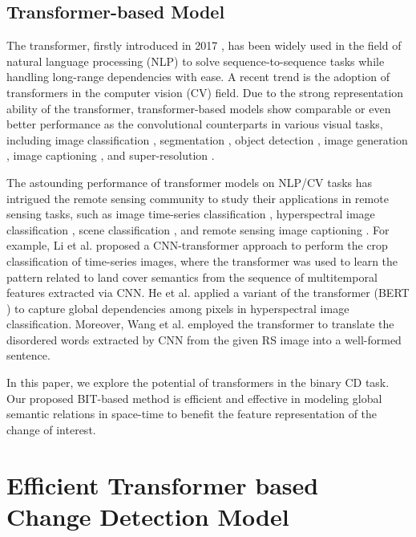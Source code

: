 \documentclass[journal]{IEEEtran}
\begin{document}
\subsection{Transformer-based Model}

The transformer, firstly introduced in 2017 \cite{Vaswani2017}, has been widely used in the field of natural language processing (NLP) to solve sequence-to-sequence tasks while handling long-range dependencies with ease. A recent trend is the adoption of transformers in the computer vision (CV) field. Due to the strong representation ability of the transformer, transformer-based models show comparable or even better performance as the convolutional counterparts in various visual tasks, including image classification \cite{Dosovitskiy2020, Touvron2020, Wu2020}, segmentation \cite{Zhang2020c, Wu2020, Zheng2020}, object detection \cite{Zhang2020c, Carion2020, Zhu2021}, image generation \cite{Chen2020h, Esser2020}, image captioning \cite{Liu2021}, and super-resolution \cite{Yang2020c, Chen2020g}.

The astounding performance of transformer models on NLP/CV tasks has intrigued the remote sensing community to study their applications in remote sensing tasks, such as image time-series classification \cite{Yuan2020, Li2020c}, hyperspectral image classification \cite{He2020a}, scene classification \cite{Bazi2021}, and remote sensing image captioning \cite{Shen2020a, Wang2020e}. For example, Li et al. \cite{Li2020c} proposed a CNN-transformer approach to perform the crop classification of time-series images, where the transformer was used to learn the pattern related to land cover semantics from the sequence of multitemporal features extracted via CNN. He et al. \cite{He2020a} applied a variant of the transformer (BERT \cite{Devlin2019}) to capture global dependencies among pixels in hyperspectral image classification. Moreover, Wang et al. \cite{Wang2020e} employed the transformer to translate the disordered words extracted by CNN from the given RS image into a well-formed sentence.

In this paper, we explore the potential of transformers in the binary CD task. Our proposed BIT-based method is efficient and effective in modeling global semantic relations in space-time to benefit the feature representation of the change of interest. 


\section{Efficient Transformer based Change Detection Model}
\label{sec:method}
\end{document}
